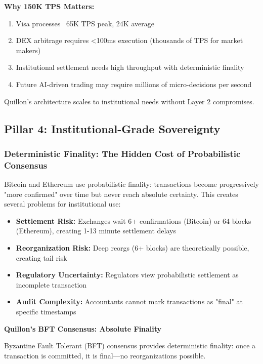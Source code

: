 \documentclass[11pt,a4paper]{article}
\begin{document}
\textbf{Why 150K TPS Matters:}
\begin{enumerate}[leftmargin=*]
\item Visa processes ~65K TPS peak, 24K average
\item DEX arbitrage requires <100ms execution (thousands of TPS for market makers)
\item Institutional settlement needs high throughput with deterministic finality
\item Future AI-driven trading may require millions of micro-decisions per second
\end{enumerate}

Quillon's architecture scales to institutional needs without Layer 2 compromises.

\subsection{Pillar 4: Institutional-Grade Sovereignty}

\subsubsection{Deterministic Finality: The Hidden Cost of Probabilistic Consensus}

Bitcoin and Ethereum use probabilistic finality: transactions become progressively "more confirmed" over time but never reach absolute certainty. This creates several problems for institutional use:

\begin{itemize}[leftmargin=*]
\item \textbf{Settlement Risk:} Exchanges wait 6+ confirmations (Bitcoin) or 64 blocks (Ethereum), creating 1-13 minute settlement delays
\item \textbf{Reorganization Risk:} Deep reorgs (6+ blocks) are theoretically possible, creating tail risk
\item \textbf{Regulatory Uncertainty:} Regulators view probabilistic settlement as incomplete transaction
\item \textbf{Audit Complexity:} Accountants cannot mark transactions as "final" at specific timestamps
\end{itemize}

\textbf{Quillon's BFT Consensus: Absolute Finality}

Byzantine Fault Tolerant (BFT) consensus provides deterministic finality: once a transaction is committed, it is final—no reorganizations possible.
\end{document}
